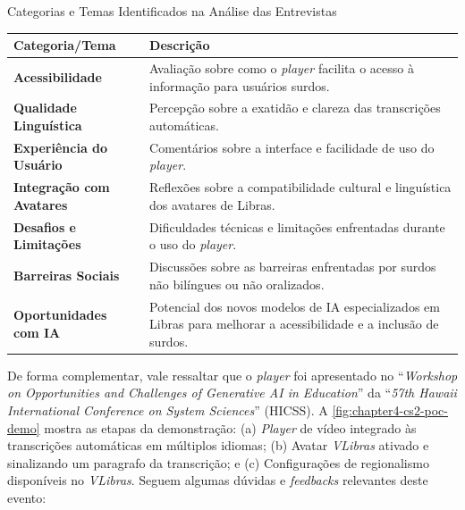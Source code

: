 \begin{quadro}[htb]
\centering
\caption{Categorias e Temas Identificados na Análise das Entrevistas}
\label{quadro:c4:cs2-grounded-theory}
\begin{tabular}{l|p{10cm}}
\hline
\textbf{Categoria/Tema}              & \textbf{Descrição}                                                                 \\ \hline
\textbf{Acessibilidade}         & Avaliação sobre como o \textit{player} facilita o acesso à informação para usuários surdos.  \\ \hline
\textbf{Qualidade Linguística}  & Percepção sobre a exatidão e clareza das transcrições automáticas.                 \\ \hline
\textbf{Experiência do Usuário} & Comentários sobre a interface e facilidade de uso do \textit{player}.                                \\ \hline
\textbf{Integração com Avatares}& Reflexões sobre a compatibilidade cultural e linguística dos avatares de Libras.    \\ \hline
\textbf{Desafios e Limitações}  & Dificuldades técnicas e limitações enfrentadas durante o uso do \textit{player}.            \\ \hline
\textbf{Barreiras Sociais}      & Discussões sobre as barreiras enfrentadas por surdos não bilíngues ou não oralizados.\\ \hline
\textbf{Oportunidades com IA}   & Potencial dos novos modelos de IA especializados em Libras para melhorar a acessibilidade e a inclusão de surdos.                  \\ \hline
\end{tabular}
\end{quadro}

De forma complementar, vale ressaltar que o \textit{player} foi apresentado no ``\textit{Workshop on Opportunities and Challenges of Generative AI in Education}'' da ``\textit{57th Hawaii International Conference on System Sciences}'' (HICSS). A \autoref{fig:chapter4-cs2-poc-demo} mostra as etapas da demonstração: (a) \textit{Player} de vídeo integrado às transcrições automáticas em múltiplos idiomas; (b) Avatar \textit{VLibras} ativado e sinalizando um paragrafo da transcrição; e (c) Configurações de regionalismo disponíveis no \textit{VLibras}. Seguem algumas dúvidas e \textit{feedbacks} relevantes deste evento:

